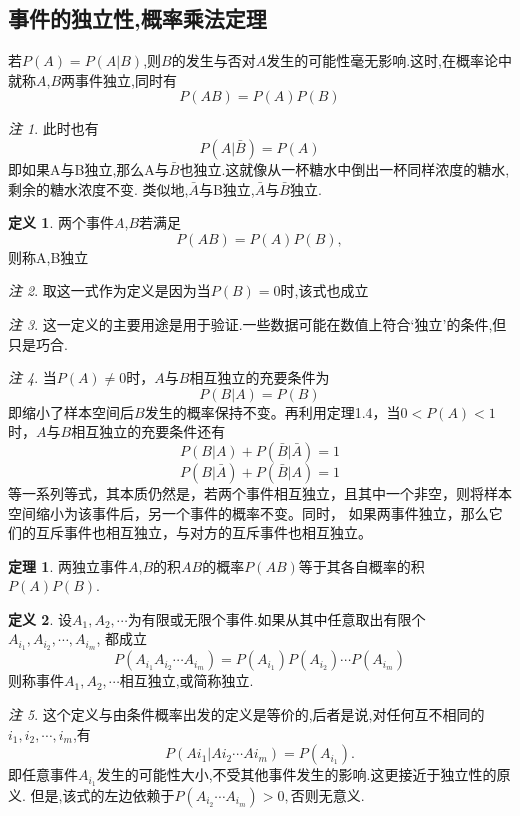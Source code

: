 \documentclass[a4paper,11pt]{article}%
\theoremstyle{remark}
\newtheorem*{remark}{注}
\theoremstyle{remark}
\theoremstyle{definition}
\newtheorem{theorem}{定理}[section]
\theoremstyle{definition}
\newtheorem*{definition}{定义}
\theoremstyle{plain}
\begin{document}
\subsection{事件的独立性,概率乘法定理}
若$P(A)=P(A|B)$,则$B$的发生与否对$A$发生的可能性毫无影响.这时,在概率论中就称$A$,$B$两事件独立,同时有 
\[P(AB)=P(A)P(B)\]
\begin{remark}
    此时也有
    \[P(A|\bar{B})=P(A)\]
    即如果A与B独立,那么A与$\bar{B}$也独立.这就像从一杯糖水中倒出一杯同样浓度的糖水,剩余的糖水浓度不变.
    类似地,$\bar{A}$与B独立,$\bar{A}$与$\bar{B}$独立.
    \end{remark}
\begin{definition}
    两个事件$A$,$B$若满足
    \[P(AB)=P(A)P(B),\]
    则称A,B独立
\end{definition}
\begin{remark}
    取这一式作为定义是因为当$P(B)=0$时,该式也成立
\end{remark}
\begin{remark}
    这一定义的主要用途是用于验证.一些数据可能在数值上符合`独立'的条件,但只是巧合.
\end{remark}
\begin{remark}
    当$P(A)\neq 0$时，$A$与$B$相互独立的充要条件为
    \[P(B|A)=P(B)\]
    即缩小了样本空间后$B$发生的概率保持不变。再利用定理1.4，当$0<P(A)<1$时，$A$与$B$相互独立的充要条件还有
    \[P(B|A)+P(\bar{B}|\bar{A})=1\]
    \[P(B|\bar{A})+P(\bar{B}|A)=1\]
    等一系列等式，其本质仍然是，若两个事件相互独立，且其中一个非空，则将样本空间缩小为该事件后，另一个事件的概率不变。同时，
    如果两事件独立，那么它们的互斥事件也相互独立，与对方的互斥事件也相互独立。
\end{remark}
\begin{theorem}
    两独立事件$A$,$B$的积$AB$的概率$P(AB)$等于其各自概率的积$P(A)P(B)$.
\end{theorem}
\begin{definition}
    设$A_1,A_2,\cdots$为有限或无限个事件.如果从其中任意取出有限个$A_{i_1},A_{i_2},\cdots,A_{i_m}$,
    都成立
    \[P(A_{i_1}A_{i_2}\cdots A_{i_m})=P(A_{i_1})P(A_{i_2})\cdots P(A_{i_m})\]
    则称事件$A_1,A_2,\cdots$相互独立,或简称独立.
\end{definition}
\begin{remark}
    这个定义与由条件概率出发的定义是等价的,后者是说,对任何互不相同的$i_1,i_2,\cdots,i_m$,有
    \[P(A{i_1}|A{i_2}\cdots A{i_m})=P(A_{i_1}).\]
    即任意事件$A_{i_1}$发生的可能性大小,不受其他事件发生的影响.这更接近于独立性的原义.
    但是,该式的左边依赖于$P(A_{i_2}\cdots A_{i_m})>0,$否则无意义.
\end{remark}
\end{document}
